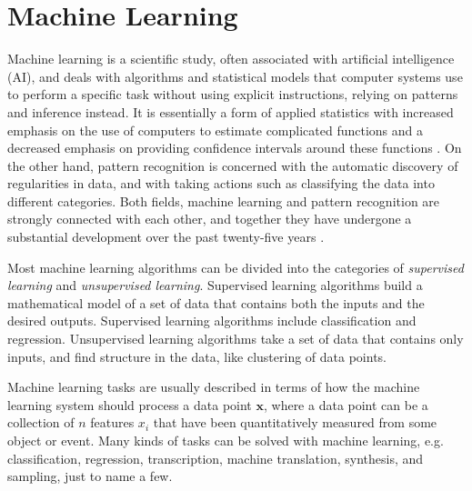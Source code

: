\documentclass{scrartcl}
\begin{document}




\newpage

\section{Machine Learning}
\label{sec:machine_learning}

Machine learning is a scientific study, often associated with artificial intelligence (AI), and deals with algorithms and statistical models that computer systems use to perform a specific task without using explicit instructions, relying on patterns and inference instead. It is essentially a form of applied statistics with increased emphasis on the use of computers to estimate complicated functions and a decreased emphasis on providing confidence intervals around these functions \cite{Goodfellow2016}. On the other hand, pattern recognition is concerned with the automatic discovery of regularities in data, and with taking actions such as classifying the data into different categories. Both fields, machine learning and pattern recognition are strongly connected with each other, and together they have undergone a substantial development over the past twenty-five years \cite{Bishop2006}.

Most machine learning algorithms can be divided into the categories of \emph{supervised learning} and \emph{unsupervised learning}. Supervised learning algorithms build a mathematical model of a set of data that contains both the inputs and the desired outputs. Supervised learning algorithms include classification and regression. Unsupervised learning algorithms take a set of data that contains only inputs, and find structure in the data, like clustering of data points. 

Machine learning tasks are usually described in terms of how the machine learning system should process a data point $\mathbf x$, where a data point can be a collection of $n$ features $x_i$ that have been quantitatively measured from some object or event. Many kinds of tasks can be solved with machine learning, e.g. classification, regression, transcription, machine translation, synthesis, and sampling, just to name a few.
\end{document}
